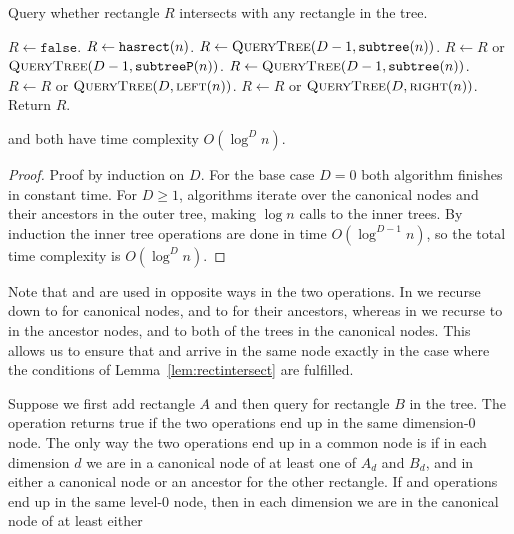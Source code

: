 \documentclass[english,gradu]{tktltiki2018}
\begin{document}
\begin{alg}\label{alg:rectcheck}
Query whether rectangle $R$ intersects with any rectangle in the tree.
\begin{algorithmic}
	\State $R\gets\texttt{false}$.
		\State $R\gets\texttt{hasrect}(n)$.
		\State $R\gets \textsc{QueryTree}(D-1,\texttt{subtree}(n))$.
		\State $R\gets R$ or $\textsc{QueryTree}(D-1,\texttt{subtreeP}(n))$.
		\State $R\gets \textsc{QueryTree}(D-1,\texttt{subtree}(n))$.
		\State $R\gets R$ or $\textsc{QueryTree}(D,\textsc{left}(n))$.
		\State $R\gets R$ or $\textsc{QueryTree}(D,\textsc{right}(n))$.
	\EndIf
	\State Return $R$.
\EndProcedure
\end{algorithmic}
\end{alg}

\begin{lem}\adddt and \checkdt both have time complexity $O(\log^D n)$.\end{lem}
\begin{proof}
Proof by induction on $D$.
For the base case $D=0$ both algorithm finishes in constant time.
For $D\ge 1$, algorithms iterate over the canonical nodes and their ancestors in the outer tree, making $\log{n}$ calls to the inner trees.
By induction the inner tree operations are done in time $O(\log^{D-1}n)$, so the total time complexity is $O(\log^D n)$.
\end{proof}

Note that \subtree{} and \subtreep{} are used in opposite ways in the two operations.
In \adddt{} we recurse down to \subtree{} for canonical nodes, and to \subtreep{} for their ancestors, whereas in \checkdt{} we recurse to \subtree{} in the ancestor nodes, and to both of the trees in the canonical nodes.
This allows us to ensure that \adddt{} and \checkdt{} arrive in the same node exactly in the case where the conditions of Lemma~\ref{lem:rectintersect} are fulfilled.

Suppose we first add rectangle $A$ and then query for rectangle $B$ in the tree.
The \checkdt operation returns true if the two operations end up in the same dimension-0 node.
The only way the two operations end up in a common node is if in each dimension $d$ we are in a canonical node of at least one of $A_d$ and $B_d$, and in either a canonical node or an ancestor for the other rectangle.
If \adddt{} and \checkdt{} operations end up in the same level-0 node, then in each dimension we are in the canonical node of at least either
\end{document}
